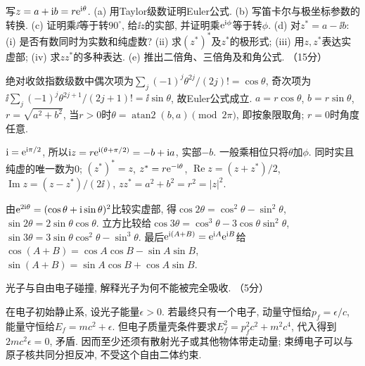 \begin{exercise}
写$z=a+\mathrm i b=r\mathrm e^{\mathrm i\theta}$.
(a) 用Taylor级数证明Euler公式.
(b) 写笛卡尔与极坐标参数的转换.
(c) 证明乘$\ii$等于转$90^\circ$, 给$\ii z$的实部, 并证明乘$\mathrm e^{\mathrm i\phi}$等于转$\phi$.
(d) 对$z^*=a-\ii b$: (i) 是否有数同时为实数和纯虚数? (ii) 求$(z^*)^*$及$z^*$的极形式; (iii) 用$z,z^*$表达实虚部; (iv) 求$zz^*$的多种表达.
(e) 推出二倍角、三倍角及和角公式. （15分）
\end{exercise}
\begin{solution}
绝对收敛指数级数中偶次项为$\sum_j(-1)^j\theta^{2j}/(2j)!=\cos\theta$, 奇次项为$\ii\sum_j(-1)^j\theta^{2j+1}/(2j+1)!=\ii\sin\theta$, 故Euler公式成立. $a=r\cos\theta$, $b=r\sin\theta$, $r=\sqrt{a^2+b^2}$, 当$r>0$时$\theta=\operatorname{atan2}(b,a)\pmod{2\pi}$, 即按象限取角; $r=0$时角度任意.

$\mathrm i=\mathrm e^{\mathrm i\pi/2}$, 所以$\mathrm i z=r\mathrm e^{\mathrm i(\theta+\pi/2)}=-b+\mathrm i a$, 实部$-b$. 一般乘相位只将$\theta$加$\phi$. 同时实且纯虚的唯一数为0; $(z^*)^*=z$, $z^*=r\mathrm e^{-\mathrm i\theta}$, $\operatorname{Re}z=(z+z^*)/2$, $\operatorname{Im}z=(z-z^*)/(2\ii)$, $zz^*=a^2+b^2=r^2=|z|^2$.

由$\mathrm e^{2\mathrm i\theta}=(\cos\theta+\mathrm i\sin\theta)^2$比较实虚部, 得$\cos2\theta=\cos^2\theta-\sin^2\theta$, $\sin2\theta=2\sin\theta\cos\theta$. 立方比较给$\cos3\theta=\cos^3\theta-3\cos\theta\sin^2\theta$, $\sin3\theta=3\sin\theta\cos^2\theta-\sin^3\theta$. 最后$\mathrm e^{\mathrm i(A+B)}=\mathrm e^{\mathrm i A}\mathrm e^{\mathrm i B}$给$\cos(A+B)=\cos A\cos B-\sin A\sin B$, $\sin(A+B)=\sin A\cos B+\cos A\sin B$.
\end{solution}

\begin{exercise}
光子与自由电子碰撞, 解释光子为何不能被完全吸收. （5分）
\end{exercise}
\begin{solution}
在电子初始静止系, 设光子能量$\epsilon>0$. 若最终只有一个电子, 动量守恒给$p_f=\epsilon/c$, 能量守恒给$E_f=mc^2+\epsilon$. 但电子质量壳条件要求$E_f^2=p_f^2c^2+m^2c^4$, 代入得到$2mc^2\epsilon=0$, 矛盾. 因而至少还须有散射光子或其他物体带走动量; 束缚电子可以与原子核共同分担反冲, 不受这个自由二体约束.
\end{solution}


